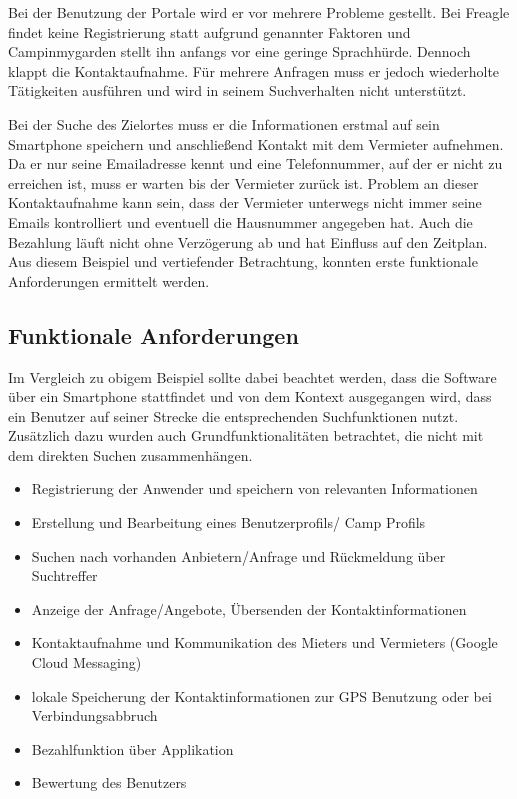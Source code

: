 Bei der Benutzung der Portale wird er vor mehrere Probleme gestellt. Bei Freagle findet keine Registrierung statt aufgrund genannter Faktoren und Campinmygarden stellt ihn anfangs vor eine geringe Sprachhürde. Dennoch klappt die Kontaktaufnahme. Für mehrere Anfragen muss er jedoch wiederholte Tätigkeiten ausführen und wird in seinem Suchverhalten nicht unterstützt.

Bei der Suche des Zielortes muss er die Informationen erstmal auf sein Smartphone speichern und anschließend Kontakt mit dem Vermieter aufnehmen. Da er nur seine Emailadresse kennt und eine Telefonnummer, auf der er nicht zu erreichen ist, muss er warten bis der Vermieter zurück ist. 
Problem an dieser Kontaktaufnahme kann sein, dass der Vermieter unterwegs nicht immer seine Emails kontrolliert und eventuell die Hausnummer angegeben hat. Auch die Bezahlung läuft nicht ohne Verzögerung ab und hat Einfluss auf den Zeitplan.\\

Aus diesem Beispiel und vertiefender Betrachtung, konnten erste funktionale Anforderungen ermittelt werden.
        	

\subsection{Funktionale Anforderungen}        	
Im Vergleich zu obigem Beispiel sollte dabei beachtet werden, dass die Software über ein Smartphone stattfindet und von dem Kontext ausgegangen wird, dass ein Benutzer auf seiner Strecke die entsprechenden Suchfunktionen nutzt. Zusätzlich dazu wurden auch Grundfunktionalitäten betrachtet, die nicht mit dem direkten Suchen zusammenhängen.

\begin{itemize}
   \item 
   Registrierung der Anwender und speichern von relevanten Informationen
   \item
   Erstellung und Bearbeitung eines Benutzerprofils/ Camp Profils
   \item 
   Suchen nach vorhanden Anbietern/Anfrage und Rückmeldung über Suchtreffer
   \item 
   Anzeige der Anfrage/Angebote, Übersenden der Kontaktinformationen 
   \item
   Kontaktaufnahme und Kommunikation des Mieters und Vermieters (Google Cloud Messaging)
   \item
   lokale Speicherung der Kontaktinformationen zur GPS Benutzung oder bei Verbindungsabbruch
   \item
   Bezahlfunktion über Applikation
   \item
   Bewertung des Benutzers

\end{itemize}


